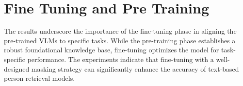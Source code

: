 \section{Fine Tuning and Pre Training}

The results underscore the importance of the fine-tuning phase in aligning the pre-trained VLMs to specific tasks. While the pre-training phase establishes a robust foundational knowledge base, fine-tuning optimizes the model for task-specific performance. The experiments indicate that fine-tuning with a well-designed masking strategy can significantly enhance the accuracy of text-based person retrieval models.






